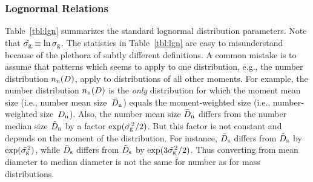\documentclass[12pt,twoside]{article}
\begin{document}
\subsubsection[Lognormal Relations]{Lognormal Relations}
Table~\ref{tbl:lgn} summarizes the standard lognormal distribution
parameters. 
Note that $\tilde{\sigma_{\mathrm{g}}} \equiv \ln \sigma_{\mathrm{g}}$.
The statistics in Table~\ref{tbl:lgn} are easy to misunderstand
because of the plethora of subtly different definitions.
A common mistake is to assume that patterns which seems to apply to
one distribution, e.g., the number distribution $n_{\mathrm{n}}(D)$, apply
to distributions of all other moments. 
For example, the number distribution $n_{\mathrm{n}}(D)$ is the
\textit{only} distribution for which the moment mean size (i.e.,
number mean size~$\bar{D}_{\mathrm{n}}$) equals the moment-weighted size (i.e.,
number-weighted size~$D_{\mathrm{n}}$).  
Also, the number mean size $\bar{D}_{\mathrm{n}}$ differs from the number median
size $\tilde{D}_{\mathrm{n}}$ by a factor $\exp(\tilde{\sigma_{\mathrm{g}}}^{\!\!2}/2)$.
But this factor is not constant and depends on the moment of the
distribution.
For instance, $\bar{D}_{\mathrm{s}}$ differs from $\tilde{D}_{\mathrm{s}}$ by $\exp(\tilde{\sigma_{\mathrm{g}}}^{\!\!2})$,
while $\bar{D}_{\mathrm{s}}$ differs from $\tilde{D}_{\mathrm{s}}$ by $\exp(3\tilde{\sigma_{\mathrm{g}}}^{\!\!2}/2)$.
Thus converting from mean diameter to median diameter is not the
same for number as for mass distributions.
\end{document}
